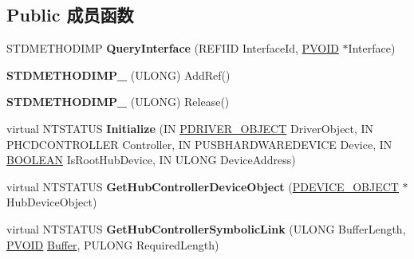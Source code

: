 \subsection*{Public 成员函数}
\begin{DoxyCompactItemize}
\item 
\mbox{\label{class_c_hub_controller_a046a83d143c64a4845b7541f663e66f5}} 
S\+T\+D\+M\+E\+T\+H\+O\+D\+I\+MP {\bfseries Query\+Interface} (R\+E\+F\+I\+ID Interface\+Id, \hyperlink{interfacevoid}{P\+V\+O\+ID} $\ast$Interface)
\item 
\mbox{\label{class_c_hub_controller_a8740ca5c6ab36c38b8d1c3a3b53b09ac}} 
{\bfseries S\+T\+D\+M\+E\+T\+H\+O\+D\+I\+M\+P\+\_\+} (U\+L\+O\+NG) Add\+Ref()
\item 
\mbox{\label{class_c_hub_controller_a70166a5fb506985b0e88b7e82c50a898}} 
{\bfseries S\+T\+D\+M\+E\+T\+H\+O\+D\+I\+M\+P\+\_\+} (U\+L\+O\+NG) Release()
\item 
\mbox{\label{class_c_hub_controller_a4074adb77d96e43986bcbb5fc9d08604}} 
virtual N\+T\+S\+T\+A\+T\+US {\bfseries Initialize} (IN \hyperlink{struct___d_r_i_v_e_r___o_b_j_e_c_t}{P\+D\+R\+I\+V\+E\+R\+\_\+\+O\+B\+J\+E\+CT} Driver\+Object, IN P\+H\+C\+D\+C\+O\+N\+T\+R\+O\+L\+L\+ER Controller, IN P\+U\+S\+B\+H\+A\+R\+D\+W\+A\+R\+E\+D\+E\+V\+I\+CE Device, IN \hyperlink{_processor_bind_8h_a112e3146cb38b6ee95e64d85842e380a}{B\+O\+O\+L\+E\+AN} Is\+Root\+Hub\+Device, IN U\+L\+O\+NG Device\+Address)
\item 
\mbox{\label{class_c_hub_controller_acfe566deb13b3e3d49b25b39bd70cfce}} 
virtual N\+T\+S\+T\+A\+T\+US {\bfseries Get\+Hub\+Controller\+Device\+Object} (\hyperlink{struct___d_e_v_i_c_e___o_b_j_e_c_t}{P\+D\+E\+V\+I\+C\+E\+\_\+\+O\+B\+J\+E\+CT} $\ast$Hub\+Device\+Object)
\item 
\mbox{\label{class_c_hub_controller_a2a7b0ffd617278f9b6bc6ac1bfe1e8cf}} 
virtual N\+T\+S\+T\+A\+T\+US {\bfseries Get\+Hub\+Controller\+Symbolic\+Link} (U\+L\+O\+NG Buffer\+Length, \hyperlink{interfacevoid}{P\+V\+O\+ID} \hyperlink{class_buffer}{Buffer}, P\+U\+L\+O\+NG Required\+Length)
\item 
\mbox{\label{class_c_hub_controller_aa3cc0e7abb9a6e4a4c14596415ce0147}} 

\end{DoxyCompactItemize}
